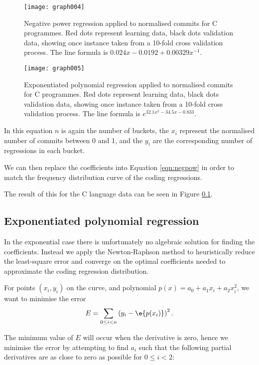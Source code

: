 \documentclass[10pt,journal,compsoc]{IEEEtran}
\begin{document}
\begin{figure}[t]
\centering
\texttt{[image: graph004]}%
\caption{\label{fig:c-negpow}Negative power regression applied to normalised commits for C programmes. Red dots represent learning data, black dots validation data, showing once instance taken from a 10-fold cross validation process. The line formula is $0.024x - 0.0192 + 0.00329x^{-1}$.}
\end{figure}

\begin{figure}[t]
\centering
\texttt{[image: graph005]}%
\caption{\label{fig:c-exp}Exponentiated polynomial regression applied to normalised commits for C programmes. Red dots represent learning data, black dots validation data, showing once instance taken from a 10-fold cross validation process. The line formula is $e^{32.1x^{2} - 34.5x - 0.833}$.}
\end{figure}


In this equation $n$ is again the number of buckets, the $x_i$ represent the normalised number of commits between 0 and 1, and the $y_i$ are the corresponding number of regressions in each bucket.

We can then replace the coefficients into Equation \ref{eqn:negpow} in order to match the frequency distribution curve of the coding regressions.

The result of this for the C language data can be seen in Figure \ref{}.

\subsection{Exponentiated polynomial regression}

In the exponential case there is unfortunately no algebraic solution for finding the coefficients. Instead we apply the Newton-Raphson method to heuristically reduce the least-square error and converge on the optimal coefficients needed to approximate the coding regression distribution.

For points $(x_i, y_i)$ on the curve, and polynomial $p(x) = a_0 + a_1 x_i + a_2 x_i^2$, we want to minimise the error
$$
E = \sum_{0 \le i < n} \left( y_i - \e{p(x_i)} \right)^2 .
$$

The minimum value of $E$ will occur when the derivative is zero, hence we minimise the error by attempting to find $a_i$ such that the following partial derivatives are as close to zero as possible for $0 \le i < 2$:
\end{document}
